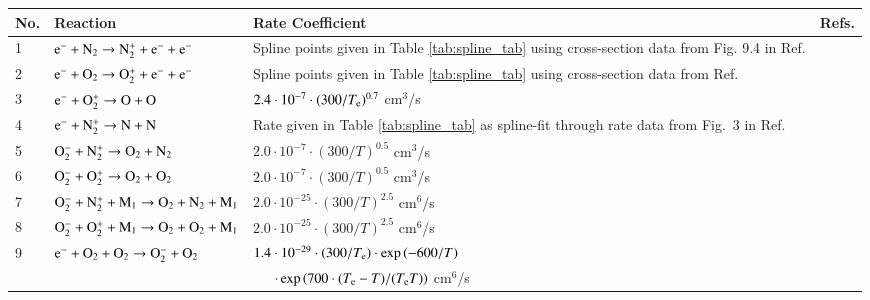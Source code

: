 \documentclass{warpdoc}
\renewcommand{\fontsizetable}{\footnotesize\scalefont{0.9}}
\begin{document}
%
\begin{table}
  \center\fontsizetable
  \begin{threeparttable}
    \label{tab:rodriguez}
    \fontsizetable
    \begin{tabular*}{\textwidth}{l@{\extracolsep{\fill}}lll}
    \toprule
    No.&Reaction\tnote{(b)} & Rate Coefficient  & Refs. \\
    \midrule
    1  & $\rm e^- + N_2   \rightarrow N_2^+ + e^- + e^-$  
       &  Spline points given in Table \ref{tab:spline_tab} using cross-section data from Fig. 9.4 in Ref. \cite{aip:1986:itikawa}
       & \cite{aip:1986:itikawa} \\
    2  & $\rm e^- + O_2   \rightarrow O_2^+ + e^- + e^-$  
       &  Spline points given in Table \ref{tab:spline_tab} using cross-section data from Ref. \cite{pcpp:1992:morgan}
       & \cite{pcpp:1992:morgan} \\
    3 & $\rm e^-+O_2^+ \rightarrow O + O$  
       & $2.4 \cdot 10^{-7} \cdot (300/T_{\rm e})^{0.7}  $ cm$^3$/s
       & \cite{aip:2001:peverall} \\
    4 & $\rm e^-+N_2^+ \rightarrow N + N$  
       & Rate given in Table \ref{tab:spline_tab} as spline-fit through rate data from Fig.~3 in Ref. \cite{aip:1998:peterson}
       &  \cite{aip:1998:peterson}\\
    5 & $\rm O_2^{-}+N_2^{+} \rightarrow O_2 + N_2$ 
       & $2.0 \cdot 10^{-7} \cdot (300/T)^{0.5}$ cm$^3$/s
       & \cite{misc:1992:kossyi}\\
    6 & $\rm O_2^{-}+O_2^{+} \rightarrow O_2 + O_2$ 
       & $2.0 \cdot 10^{-7} \cdot (300/T)^{0.5}$ cm$^3$/s
       & \cite{misc:1992:kossyi}\\
    7 & $\rm O_2^{-}+N_2^{+} + M_1\rightarrow O_2 + N_2 +M_1$ 
       & $2.0 \cdot 10^{-25} \cdot (300/T)^{2.5}$ cm$^6$/s  
       & \cite{misc:1992:kossyi}\\
    8 & $\rm O_2^{-}+O_2^{+} + M_1\rightarrow O_2 + O_2 +M_1$ 
       & $2.0 \cdot 10^{-25} \cdot (300/T)^{2.5}$ cm$^6$/s  
       & \cite{misc:1992:kossyi}\\
    9 & $\rm e^- + O_2 +O_2 \rightarrow O_2^- + O_2$  
       &  $1.4 \cdot 10^{-29} \cdot \left( {300}/{T_{\rm e}}\right)\cdot  \exp \left( {-600}/{T}\right)$
       & \cite{misc:1992:kossyi}\\
    ~  &   
       & ~~~$\cdot \exp \left( {700 \cdot (T_{\rm e}-T)}/{(T_{\rm e} T)}  \right)$ cm$^6$/s
       & ~\\

\end{tabular*}
\end{threeparttable}
\end{table}
\end{document}
